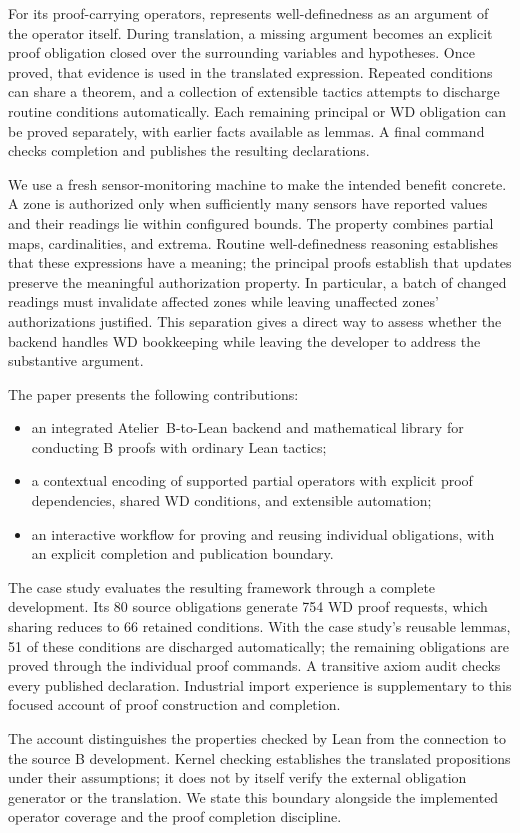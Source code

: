 For its proof-carrying operators, \barrel represents well-definedness as
an argument of the operator itself. During translation, a missing argument
becomes an explicit proof obligation closed over the surrounding variables
and hypotheses. Once proved, that evidence is used in the translated
expression. Repeated conditions can share a theorem, and a collection of
extensible tactics attempts to discharge routine conditions automatically.
Each remaining principal or WD obligation can be proved separately, with
earlier facts available as lemmas. A final command checks completion and
publishes the resulting declarations.

We use a fresh sensor-monitoring machine to make the intended benefit
concrete. A zone is authorized only when sufficiently many sensors have
reported values and their readings lie within configured bounds. The
property combines partial maps, cardinalities, and extrema. Routine
well-definedness reasoning establishes that these expressions have a
meaning; the principal proofs establish that updates preserve the
meaningful authorization property. In particular, a batch of changed
readings must invalidate affected zones while leaving unaffected zones'
authorizations justified. This separation gives a direct way to assess
whether the backend handles WD bookkeeping while leaving the developer
to address the substantive argument.

The paper presents the following contributions:
\begin{itemize}
  \item an integrated Atelier~B-to-Lean backend and mathematical library
    for conducting B proofs with ordinary Lean tactics;
  \item a contextual encoding of supported partial operators with explicit
    proof dependencies, shared WD conditions, and extensible automation;
  \item an interactive workflow for proving and reusing individual
    obligations, with an explicit completion and publication boundary.
\end{itemize}
The case study evaluates the resulting framework through a complete
development. Its 80 source obligations generate 754 WD proof requests,
which sharing reduces to 66 retained conditions. With the case study's
reusable lemmas, 51 of these conditions are discharged automatically;
the remaining obligations are proved through the individual proof
commands. A transitive axiom audit checks every published declaration.
Industrial import experience is supplementary to this focused account
of proof construction and completion.

The account distinguishes the properties checked by Lean from the
connection to the source B development. Kernel checking establishes the
translated propositions under their assumptions; it does not by itself
verify the external obligation generator or the translation. We state
this boundary alongside the implemented operator coverage and the proof
completion discipline.
